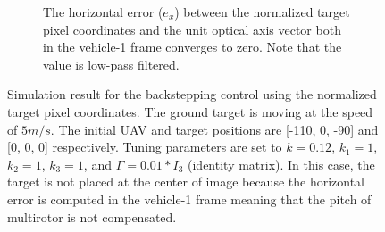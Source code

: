 \begin{figure}
\begin{subfigure}[b]{0.8\linewidth}
		\caption{The horizontal error ($e_x$) between the normalized target pixel coordinates and the unit optical axis vector both in the vehicle-1 frame converges to zero. Note that the value is low-pass filtered.}
	\end{subfigure}	
	\caption{Simulation result for the backstepping control using the normalized target pixel coordinates. The ground target is moving at the speed of $5m/s$. The initial UAV and target positions are [-110, 0, -90] and [0, 0, 0] respectively. Tuning parameters are set to $k=0.12$, $k_1=1$, $k_2=1$, $k_3=1$, and $\Gamma=0.01*I_3$ (identity matrix). In this case, the target is not placed at the center of image because the horizontal error is computed in the vehicle-1 frame meaning that the pitch of multirotor is not compensated.}
	\label{image_5mps}
\end{figure}

